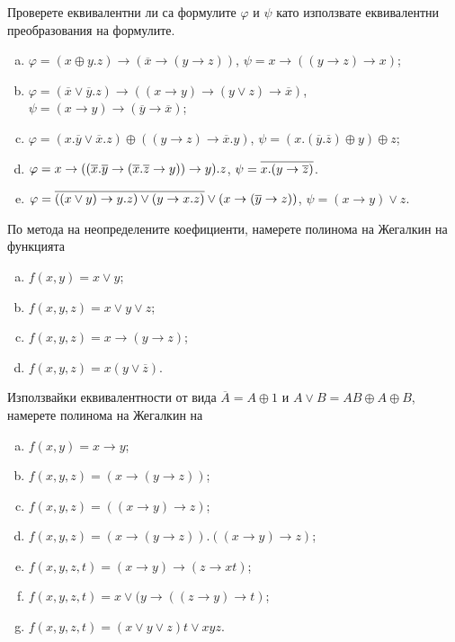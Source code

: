 \begin{problem} %
  Проверете еквивалентни ли са формулите $\varphi$ и $\psi$ като използвате еквивалентни преобразования на формулите.
  \begin{enumerate}[a)]
  \item
    $\varphi = (x\oplus y.z)\rightarrow (\overline{x}\rightarrow (y\rightarrow z))$,
    $\psi = x\rightarrow ((y\rightarrow z)\rightarrow x)$;
  \item
    $\varphi = (\overline{x}\vee \overline{y}.z)\rightarrow ((x\rightarrow y)\rightarrow (y\vee z)\rightarrow\overline{x})$,
    $\psi = (x\rightarrow y)\rightarrow(\overline{y}\rightarrow\overline{x})$;
  \item
    $\varphi = (x.\overline{y}\vee \overline{x}.z)\oplus ((y\rightarrow z)\rightarrow \overline{x}.y)$,
    $\psi = (x.(\overline{y}.\overline{z})\oplus y)\oplus z$;
  \item
    $\varphi = x\rightarrow ((\overline{x}.\overline{y}\rightarrow(\overline{x}.\overline{z}\rightarrow y))\rightarrow y).z$,
    $\psi = \overline{x.(y\rightarrow\overline{z})}$.
  \item
    $\varphi = \overline{((x\vee y) \rightarrow y.z)\vee (y\rightarrow x.z)} \vee (x\rightarrow (\overline{y}\rightarrow z))$,
    $\psi = (x\rightarrow y)\vee z$.
  \end{enumerate}
\end{problem}

\begin{problem}
  По метода на неопределените коефициенти, намерете полинома на Жегалкин на функцията 
  \begin{enumerate}[a)]
  \item
    $f(x,y) = x\vee y$;
  \item
    $f(x,y,z) = x\vee y \vee z$;
  \item
    $f(x,y,z) = x\rightarrow (y \rightarrow z)$;
  \item
    $f(x,y,z) = x(y\vee\overline{z})$.
  \end{enumerate}
\end{problem}

\begin{problem}
  Използвайки еквивалентности от вида $\overline{A} = A\oplus 1$ и $A\vee B = AB\oplus A\oplus B$, 
  намерете полинома на Жегалкин на 
  \begin{enumerate}[a)]
  \item
    $f(x,y) = x\rightarrow y$;
  \item
    $f(x,y,z) = (x\rightarrow (y\rightarrow z))$;
  \item
    $f(x,y,z) = ((x\rightarrow y)\rightarrow z)$;
  \item
    $f(x,y,z) = (x\rightarrow (y\rightarrow z)).((x\rightarrow y)\rightarrow z)$;
  \item
    $f(x,y,z,t) = (x\rightarrow y)\rightarrow (z\rightarrow xt)$;
  \item
    $f(x,y,z,t) = x\vee (y\rightarrow ((z\rightarrow y)\rightarrow t)$;
  \item
    $f(x,y,z,t) = (x\vee y\vee z)t \vee xyz$.
  \end{enumerate}
\end{problem}


